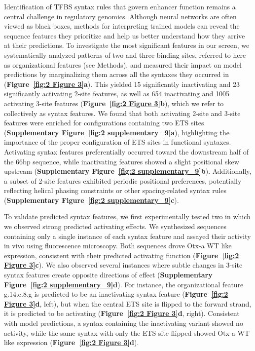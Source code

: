 Identification of TFBS syntax rules that govern enhancer function remains a central challenge in regulatory genomics\cite{Jindal2021-zk}. Although neural networks are often viewed as black boxes, methods for interpreting trained models can reveal the sequence features they prioritize and help us better understand how they arrive at their predictions\cite{Novakovsky2022-ft}. To investigate the most significant features in our screen, we systematically analyzed patterns of two and three binding sites, referred to here as organizational features (see Methods), and measured their impact on model predictions by marginalizing them across all the syntaxes they occurred in (\textbf{Figure~\ref{fig:2 Figure 3}a}). This yielded 15 significantly inactivating and 23 significantly activating 2-site features, as well as 654 inactivating and 1005 activating 3-site features (\textbf{Figure~\ref{fig:2 Figure 3}b}), which we refer to collectively as syntax features. We found that both activating 2-site and 3-site features were enriched for configurations containing two ETS sites (\textbf{Supplementary Figure~\ref{fig:2 supplementary_9}a}), highlighting the importance of the proper configuration of ETS sites in functional syntaxes. Activating syntax features preferentially occurred toward the downstream half of the 66bp sequence, while inactivating features showed a slight positional skew upstream (\textbf{Supplementary Figure~\ref{fig:2 supplementary_9}b}). Additionally, a subset of 2-site features exhibited periodic positional preferences, potentially reflecting helical phasing constraints or other spacing-related syntax rules (\textbf{Supplementary Figure~\ref{fig:2 supplementary_9}c}).

To validate predicted syntax features, we first experimentally tested two in which we observed strong predicted activating effects. We synthesized sequences containing only a single instance of each syntax feature and assayed their activity in vivo using fluorescence microscopy. Both sequences drove Otx-a WT like expression, consistent with their predicted activating function (\textbf{Figure~\ref{fig:2 Figure 3}c}). We also observed several instances where subtle changes in 3-site syntax features create opposite directions of effect (\textbf{Supplementary Figure~\ref{fig:2 supplementary_9}d}). For instance, the organizational feature g.14.e.8.g is predicted to be an inactivating syntax feature (\textbf{Figure~\ref{fig:2 Figure 3}d}, left), but when the central ETS site is flipped to the forward strand, it is predicted to be activating (\textbf{Figure~\ref{fig:2 Figure 3}d}, right). Consistent with model predictions, a syntax containing the inactivating variant showed no activity, while the same syntax with only the ETS site flipped showed Otx-a WT like expression (\textbf{Figure~\ref{fig:2 Figure 3}d}).

